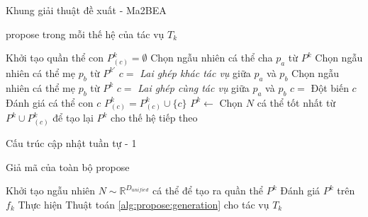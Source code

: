 \begin{frame}{Khung giải thuật đề xuất - Ma2BEA}
    \begin{algorithm}[H]
        \caption{\gls{propose} trong mỗi thế hệ của tác vụ $T_k$}
        \fontsize{6pt}{10}\selectfont
        \begin{algorithmic}[1]
            \State Khởi tạo quần thể con $P_{(c)}^k=\emptyset$
                \State Chọn ngẫu nhiên cá thể cha $p_a$ từ $P^k$
                    \State Chọn ngẫu nhiên cá thể mẹ $p_b$ từ $P^{k'}$
                    \State $c = $ \emph{Lai ghép khác tác vụ} giữa $p_a$ và $p_b$
                \Else
                    \State Chọn ngẫu nhiên cá thể mẹ $p_b$ từ $P^k$
                    \State $c = $ \emph{Lai ghép cùng tác vụ} giữa $p_a$ và $p_b$
                \EndIf
                \State $c =$ Đột biến $c$
                \State Đánh giá cá thể con $c$
                \State $P^k_{(c)} = P^k_{(c)} \cup \{c\}$
            \EndWhile
            \State $P^k \leftarrow$ Chọn $N$ cá thể tốt nhất từ $P^k \cup P^k_{(c)}$ để tạo lại $P^k$ cho thế hệ tiếp theo
        \end{algorithmic}
        \label{alg:propose:generation}
    \end{algorithm}
\end{frame}

\begin{frame}{Cấu trúc cập nhật tuần tự - 1}
    \begin{algorithm}[H]
        \caption{Giả mã của toàn bộ \gls{propose}}
        \begin{algorithmic}[1]
                \State Khởi tạo ngẫu nhiên $N \sim \mathbb{R}^{D_{unified}}$ cá thể để tạo ra quần thể $P^k$
                \State Đánh giá $P^k$ trên $f_k$
            \EndFor
                    \State Thực hiện Thuật toán \ref{alg:propose:generation} cho tác vụ $T_k$
                \EndFor
            \EndWhile
        \end{algorithmic}
        \label{alg:propose:propose}
    \end{algorithm}
\end{frame}

